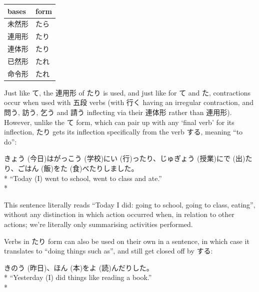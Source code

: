 \documentclass[11pt, b5paper, twoside, openright, onecolumn]{book}
\makeatletter
\newcommand*{\rubystack}[2]{{\relscale{0.5}%
  \begin{tabular}[b]{@{}c@{}}%
    {#1}\\%
   {\textscale{2}{#2}}%
  \end{tabular}}%
}
\DeclareRobustCommand*{\ruby}[2]{%
  \mbox{%
    \setlength{\parskip}{0ex}%
    \BeginAccSupp{method=pdfstringdef,ActualText={#1}}%
      \rubystack{\phantom{#2}}{#1}%
      \llap{%
        \rubystack{#2}{\phantom{#1}}%
      }%
    \EndAccSupp{}%
  }%
}
\renewcommand*{\ruby}[2]{#2 (#1)}%
\newenvironment{exampleblock}{
\setlength{\parindent}{0.6in}
\begin{minipage}[t]{\dimexpr\textwidth-\parindent}}
{\end{minipage}}
\newenvironment{mytabular}[1]{\noindent\hspace{0.4in}
\begin{tabular}[h]{#1}}{\end{tabular}}
\makeatother
\begin{document}
\vspace{0.5cm}
\smaller
\begin{mytabular}{| l  l |}\hline 
\rule{0pt}{2.4ex}bases & form\\ 
\hline
\rule{0pt}{2.4ex}未然形 & \index[japanese]{たら}たら\\ 
\rule{0pt}{2.4ex}連用形 & たり\\ 
\rule{0pt}{2.4ex}連体形 & たり\\ 
\rule{0pt}{2.4ex}已然形 & たれ\\ 
\rule{0pt}{2.4ex}命令形 & たれ\\ 
\hline 
\end{mytabular}
\larger
\vspace{0.5cm}


Just like て‚ the 連用形 of たり is used‚ and just like for て and た‚ contractions occur when used with 五段 verbs (with 行く having an irregular contraction‚ and 問う‚ 訪う‚ 乞う and 請う inflecting via their 連体形 rather than 連用形). However‚ unlike the て form‚ which can pair up with any ‘final verb’ for its inflection‚ たり gets its inflection specifically from the verb する‚ meaning “to do”:

\vspace{0.4cm}
\begin{exampleblock}
\ruby{今日}{きょう}は\ruby{学校}{がっこう}に\ruby{行}{い}ったり、\ruby{授業}{じゅぎょう}に\ruby{出}{で}たり、ご\ruby{飯}{はん}を\ruby{食}{た}べたりしました。 \\* 
“Today (I) went to school‚ went to class and ate.” \\* 
\end{exampleblock}
\vspace{0.2cm}

This sentence literally reads “Today I did: going to school‚ going to class‚ eating”‚ without any distinction in which action occurred when‚ in relation to other actions; we’re literally only summarising activities performed.

Verbs in たり form can also be used on their own in a sentence‚ in which case it translates to “doing things such as”‚ and still get closed off by する:

\vspace{0.4cm}
\begin{exampleblock}
\ruby{昨日}{きのう}、\ruby{本}{ほん}を\ruby{読}{よ}んだりした。 \\* 
“Yesterday (I) did things like reading a book.” \\* 
\end{exampleblock}
\vspace{0.2cm}
\end{document}
